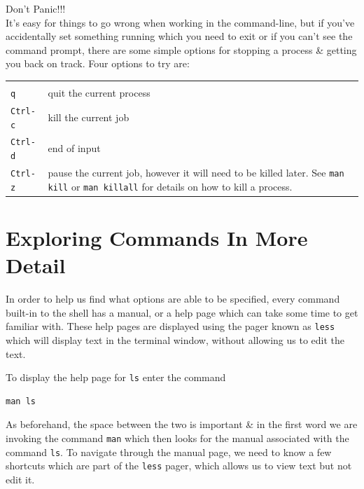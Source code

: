 \documentclass[a4paper,12pt,twoside]{memoir}
\begin{document}
\begin{warning}
{\Huge Don't Panic!!!}\\
It's easy for things to go wrong when working in the command-line, but if you've accidentally set something running which you need to exit or if you can't see the command prompt, there are some simple options for stopping a process \& getting you back on track.
Four options to try are: \\
\begin{tabular}{p{4cm} p{8cm}}
\centering
 & \\
 \texttt{q} & quit the current process \\
 \texttt{Ctrl-c} & kill the current job \\
 \texttt{Ctrl-d} & end of input \\
 \texttt{Ctrl-z} & pause the current job, however it will need to be
 killed later. See \texttt{man kill} or \texttt{man killall} for details on how to kill a process. \\

\end{tabular}
\end{warning}

\clearpage
\section{Exploring Commands In More Detail}

\begin{information}
In order to help us find what options are able to be specified, every command built-in to the shell has a manual, or a help page which can take some time to get familiar with.
These help pages are displayed using the pager known as \texttt{less} which will display text in the terminal window, without allowing us to edit the text. \\
\end{information}

\begin{steps}
To display the help page for \texttt{ls} enter the command \\
\begin{lstlisting}
man ls
\end{lstlisting}
As beforehand, the space between the two is important \& in the first word we are invoking the command \texttt{man} which then looks for the manual associated with the command \texttt{ls}.
To navigate through the manual page, we need to know a few shortcuts which are part of the \texttt{less} pager, which allows us to view text but not edit it. \\
\end{steps}
\end{document}
